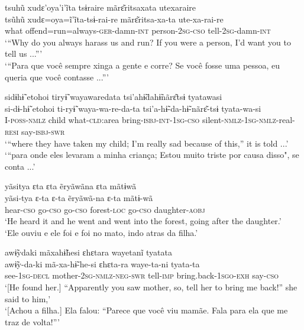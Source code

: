 \documentclass[output=paper,
modfonts,nonflat
]{langsci/langscibook}
\begin{document}
\ea tsuhũ xudɛ'oya'i'ĩta tsɨraire mãrɛ͂ritsaxata utexaraire\\[.3em]
\gll tsũhũ	xudɛ=oya=ĩ'ĩta-tsɨ-rai-re			mãrɛ͂ritsa-xa-ta	ute-xa-rai-re\\
what	offend=run=always-\textsc{ger}-damn-\textsc{int}	person-\textsc{2sg-cso}	tell-\textsc{2sg}-damn-\textsc{int}\\
\glt ‘“Why do you always harass us and run? If you were a person, I’d want you to tell us ...”’\\
‘“Para que você sempre xinga a gente e corre? Se você fosse uma pessoa, eu queria que você contasse ...”'
\z

\ea sidɨhɨ̃ etohoi tiryɨ̃ wayawaredata tsi'ahɨ̃dahɨ̃nãrɛ͂tsɨ tyatawasi\\[.3em]
\gll si-dɨ-hɨ̃		etohoi	ti-ryɨ̃			waya-wa-re-da-ta			tsi'a-hɨ̃-da-hɨ̃-nãrɛ͂-tsɨ			tyata-wa-si{\footnotemark}\\
I-\textsc{poss-nmlz}	child	what-\textsc{cld}:area	bring-\textsc{isbj-int-1sg-cso}	silent-\textsc{nmlz-1sg-nmlz}-real-\textsc{resi}	say-\textsc{isbj-swr}\\
\glt ‘“where they have taken my child; I’m really sad because of this,” it is told ...'\\
‘“para onde eles levaram a minha criança; Estou muito triste por causa disso", se conta ...'
\z

\ea yãsitya ɛta ɛta ẽryãwãna ɛta mãtɨwã\\[.3em]
\gll yãsi-tya		ɛ-ta		ɛ-ta		ẽryãwã-na		ɛ-ta		mãtɨ-wã\\
hear-\textsc{cso}	go-\textsc{cso}	go-\textsc{cso}	forest-\textsc{loc}		go-\textsc{cso}	daughter-\textsc{aobj}\\
\glt ‘He heard it and he went and went into the forest, going after the daughter.’\\
‘Ele ouviu e ele foi e foi no mato, indo atras da filha.'
\z

\largerpage[2]
\ea awɨ̃ydaki mãxahɨ̃hesi ɛhɛtara wayetanĩ tyatata\\[.3em]
\gll awɨ̃y-da-ki	mã-xa-hɨ̃-he-si				ɛhɛta-ra	waye-ta-ni					tyata-ta\\
see-\textsc{1sg-decl}	mother-\textsc{2sg-nmlz-neg-swr}	tell-\textsc{imp}	bring.back-\textsc{1sgo-exh} 	say-\textsc{cso}\\
\glt ‘[He found her.] “Apparently you saw mother, so,{\footnotemark} tell her to bring me back!” she said to him,’\\
‘[Achou a filha.] Ela falou: “Parece que você viu mamãe. Fala para ela que me traz de volta!”'
\z
\end{document}
